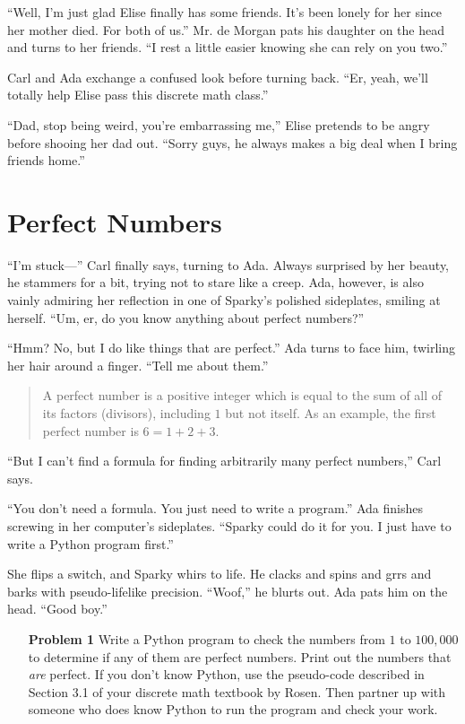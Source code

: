 \documentclass{article}
\begin{document}
``Well, I'm just glad Elise finally has some friends.
It's been lonely for her since her mother died. For both
of us.'' Mr. de Morgan pats his daughter on the head and
turns to her friends. ``I rest a little easier knowing
she can rely on you two.''

Carl and Ada exchange a confused look before turning
back. ``Er, yeah, we'll totally help Elise pass this
discrete math class.''

``Dad, stop being weird, you're embarrassing me,''
Elise pretends to be angry before shooing her dad out.
``Sorry guys, he always makes a big deal when I bring
friends home.''

\section{Perfect Numbers}

``I'm stuck---'' Carl finally says, turning to Ada. Always
surprised by her beauty, he stammers for a bit, trying
not to stare like a creep. 
Ada, however, is also
vainly admiring her reflection in one of Sparky's polished
sideplates, smiling at herself.
``Um, er, do you know anything about perfect numbers?''

``Hmm? No, but I do like things that are perfect.''
Ada turns to face him, twirling her hair around a finger.
``Tell me about them.''

\begin{quote}
A perfect number is a positive integer which is equal
to the sum of all of its factors (divisors), including $1$ but
not itself. As an example, the first perfect number
is $6 = 1 + 2 + 3$.
\end{quote}

``But I can't find a formula for finding arbitrarily
many perfect numbers,'' Carl says.

``You don't need a formula. You just need to
write a program.'' Ada finishes screwing in
her computer's sideplates. ``Sparky could do it
for you. I just have to write a Python program
first.''

She flips a switch, and Sparky whirs to life. 
He clacks and spins and grrs and barks with
pseudo-lifelike precision. ``Woof,'' he blurts
out. Ada pats him on the head. ``Good boy.''

\begin{enumerate}
\item[\textbf{Problem 1}] Write a Python program to check the
numbers from $1$ to $100,000$ to determine if any
of them are perfect numbers. Print out the numbers
that \emph{are} perfect. If you don't know
Python,
use the pseudo-code
described in Section 3.1 of your discrete math
textbook by Rosen. Then partner up with someone who does
know Python to run the program and check your work.
\end{enumerate}
\end{document}
